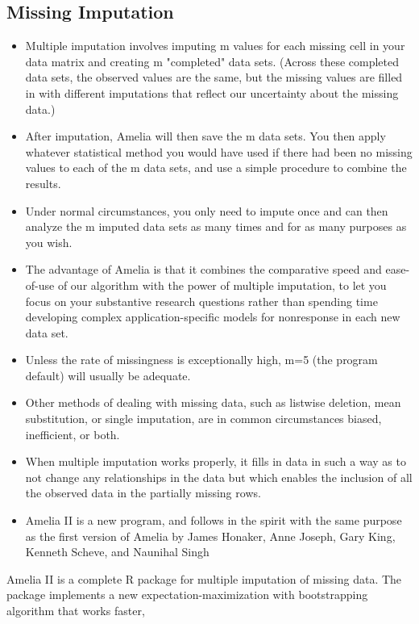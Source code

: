\subsection{Missing Imputation}
\begin{itemize}
\item Multiple imputation involves imputing m values for each missing cell in your data matrix and creating m "completed" data sets. (Across these completed data sets, the observed values are the same, but the missing values are filled in with different imputations that reflect our uncertainty about the missing data.) 
\item After imputation, Amelia will then save the m data sets. You then apply whatever statistical method you would have used if there had been no missing values to each of the m data sets, and use a simple procedure to combine the results. 
\item Under normal circumstances, you only need to impute once and can then analyze the m imputed data sets as many times and for as many purposes as you wish. 
\item The advantage of Amelia is that it combines the comparative speed and ease-of-use of our algorithm with the power of multiple imputation, to let you focus on your substantive research questions rather than spending time developing complex application-specific models for nonresponse in each new data set. 
\item Unless the rate of missingness is exceptionally high, m=5 (the program default) will usually be adequate. 
\item Other methods of dealing with missing data, such as listwise deletion, mean substitution, or single imputation, are in common circumstances biased, inefficient, or both. 
\item When multiple imputation works properly, it fills in data in such a way as to not change any relationships in the data but which enables the inclusion of all the observed data in the partially missing rows.

\item Amelia II is a new program, and follows in the spirit with the same purpose as the first version of Amelia by James Honaker, Anne Joseph, Gary King, Kenneth Scheve, and Naunihal Singh
\end{itemize}
\newpage
Amelia II is a complete R package for multiple imputation of missing data. 
The package implements a new expectation-maximization with bootstrapping algorithm that works faster,
